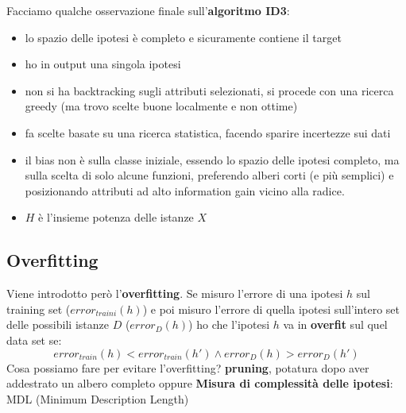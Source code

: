 Facciamo qualche osservazione finale sull'\textbf{algoritmo ID3}:
\begin{itemize}
  \item lo spazio delle ipotesi è completo e sicuramente contiene il target
  \item ho in output una singola ipotesi
  \item non si ha backtracking sugli attributi selezionati, si procede con una ricerca greedy (ma trovo scelte buone localmente e non ottime)
  \item fa scelte basate su una ricerca statistica, facendo sparire incertezze sui dati
  \item il bias non è sulla classe iniziale, essendo lo spazio delle ipotesi completo, ma sulla scelta di solo alcune funzioni, preferendo alberi corti (e più semplici) e posizionando attributi ad alto information gain vicino alla radice. 
  \item $H$ è l'insieme potenza delle istanze $X$
\end{itemize}

\subsection{Overfitting}

Viene introdotto però l'\textbf{overfitting}. Se misuro l'errore di una ipotesi $h$ sul training set ($error_{traini}(h)$) e poi misuro l'errore di quella ipotesi sull'intero set delle possibili istanze $D$ ($error_D(h)$) ho che l'ipotesi $h$ va in \textbf{overfit} sul quel data set se: 
$$error_{train}(h) < error_{train}(h') \land error_D(h)>error_D(h')$$
Cosa possiamo fare per evitare l’overfitting? \textbf{pruning}, potatura dopo aver addestrato un albero completo oppure 
\textbf{Misura di complessità delle ipotesi}: MDL (Minimum Description Length)